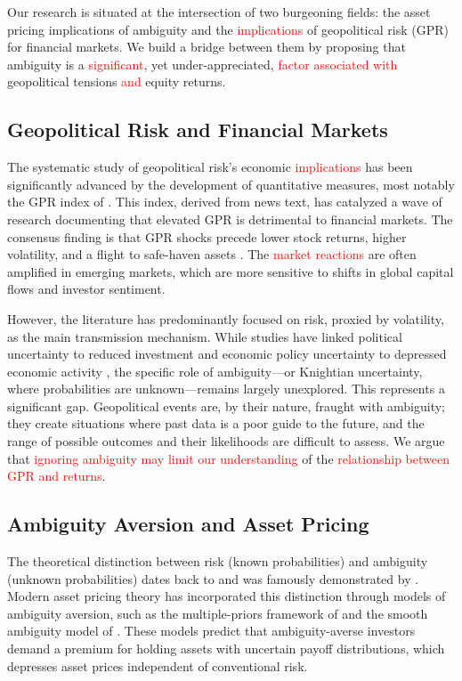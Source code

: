 \documentclass[preprint,12pt,authoryear]{elsarticle}
\begin{document}
Our research is situated at the intersection of two burgeoning fields: the asset pricing implications of ambiguity and the \textcolor{red}{implications} of geopolitical risk (GPR) for financial markets. We build a bridge between them by proposing that ambiguity is a \textcolor{red}{significant}, yet under-appreciated, \textcolor{red}{factor associated with} geopolitical tensions \textcolor{red}{and} equity returns.

\subsection{Geopolitical Risk and Financial Markets}

The systematic study of geopolitical risk's economic \textcolor{red}{implications} has been significantly advanced by the development of quantitative measures, most notably the GPR index of \citet{Caldara2022}. This index, derived from news text, has catalyzed a wave of research documenting that elevated GPR is detrimental to financial markets. The consensus finding is that GPR shocks precede lower stock returns, higher volatility, and a flight to safe-haven assets \citep{Caldara2022}. The \textcolor{red}{market reactions} are often amplified in emerging markets, which are more sensitive to shifts in global capital flows and investor sentiment.

However, the literature has predominantly focused on risk, proxied by volatility, as the main transmission mechanism. While studies have linked political uncertainty to reduced investment \citep{Pastor2013} and economic policy uncertainty to depressed economic activity \citep{Baker2016}, the specific role of ambiguity—or Knightian uncertainty, where probabilities are unknown—remains largely unexplored. This represents a significant gap. Geopolitical events are, by their nature, fraught with ambiguity; they create situations where past data is a poor guide to the future, and the range of possible outcomes and their likelihoods are difficult to assess. We argue that \textcolor{red}{ignoring ambiguity may limit our understanding} of the \textcolor{red}{relationship between GPR and returns}.

\subsection{Ambiguity Aversion and Asset Pricing}

The theoretical distinction between risk (known probabilities) and ambiguity (unknown probabilities) dates back to \citet{Knight1921} and was famously demonstrated by \citet{Ellsberg1961}. Modern asset pricing theory has incorporated this distinction through models of ambiguity aversion, such as the multiple-priors framework of \citet{Gilboa1989} and the smooth ambiguity model of \citet{Klibanoff2005}. These models predict that ambiguity-averse investors demand a premium for holding assets with uncertain payoff distributions, which depresses asset prices independent of conventional risk.
\end{document}
